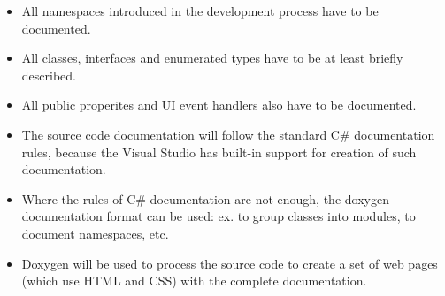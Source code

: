 \documentclass{article}
\begin{document}
\begin{itemize}

  \item All namespaces introduced in the development process have to be documented. 

  \item All classes, interfaces and enumerated types have to be at least briefly described. 

  \item All public properites and UI event handlers also have to be documented.

  \item The source code documentation will follow the standard C\# documentation rules, because the
  Visual Studio has built-in support for creation of such documentation.

  \item Where the rules of C\# documentation are not enough, the doxygen documentation format can be
  used: ex. to group classes into modules, to document namespaces, etc.

  \item Doxygen will be used to process the source code to create a set of web pages (which use HTML
  and CSS) with the complete documentation.

\end{itemize}

% 
% 
% 
% 
% 
% 
% 
% 
% 

\newpage
\end{document}
